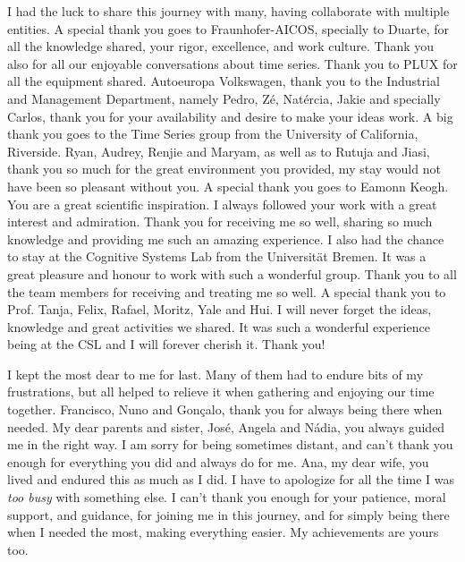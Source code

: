 \begin{ntacknowledgements}
I had the luck to share this journey with many, having collaborate with multiple entities. A special thank you goes to Fraunhofer-AICOS, specially to Duarte, for all the knowledge shared, your rigor, excellence, and work culture. Thank you also for all our enjoyable conversations about time series. Thank you to PLUX for all the equipment shared. Autoeuropa Volkswagen, thank you to the Industrial and Management Department, namely Pedro, Zé, Natércia, Jakie and specially Carlos, thank you for your availability and desire to make your ideas work. A big thank you goes to the Time Series group from the University of California, Riverside. Ryan, Audrey, Renjie and Maryam, as well as to Rutuja and Jiasi, thank you so much for the great environment you provided, my stay would not have been so pleasant without you. A special thank you goes to Eamonn Keogh. You are a great scientific inspiration. I always followed your work with a great interest and admiration. Thank you for receiving me so well, sharing so much knowledge and providing me such an amazing experience. I also had the chance to stay at the Cognitive Systems Lab from the Universität Bremen. It was a great pleasure and honour to work with such a wonderful group. Thank you to all the team members for receiving and treating me so well. A special thank you to Prof. Tanja, Felix, Rafael, Moritz, Yale and Hui. I will never forget the ideas, knowledge and great activities we shared. It was such a wonderful experience being at the CSL and I will forever cherish it. Thank you!

I kept the most dear to me for last. Many of them had to endure bits of my frustrations, but all helped to relieve it when gathering and enjoying our time together. Francisco, Nuno and Gonçalo, thank you for always being there when needed. My dear parents and sister, José, Angela and Nádia, you always guided me in the right way. I am sorry for being sometimes distant, and can't thank you enough for everything you did and always do for me. Ana, my dear wife, you lived and endured this as much as I did. I have to apologize for all the time I was \textit{too busy} with something else. I can't thank you enough for your patience, moral support, and guidance, for joining me in this journey, and for simply being there when I needed the most, making everything easier. My achievements are yours too.

\end{ntacknowledgements}